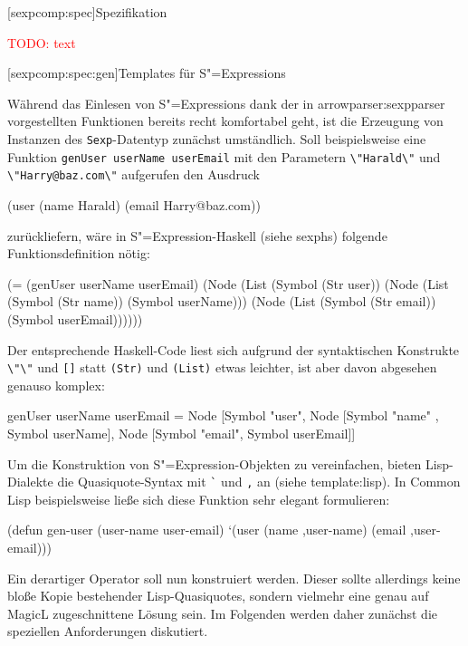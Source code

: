 \documentclass[12pt, a4paper, bibgerm]{scrbook}
\newenvironment{DIFnomarkup}{}{}
\newcommand\icode[1]{\lstinline?#1?}
\newcommand{\todo}[1]{
  \textcolor{red}{TODO: #1}
}
\newcommand\lsection{}
\newcommand\lsubsection{}
\newcommand\cref{}
\newcommand\sref{}
\newcommand{\seec}[1]{(siehe \cref{#1})}
\newcommand{\sees}[1]{(siehe \sref{#1})}
\newcommand{\sexp}{S"=Expression}
\newcommand{\sexps}{S"=Expressions}
\begin{document}
\lsection[sexpcomp:spec]{Spezifikation}

\todo{text}

\lsubsection[sexpcomp:spec:gen]{Templates für \sexps}

Während das Einlesen von \sexps{} dank der in
\sref{arrowparser:sexpparser} vorgestellten Funktionen bereits recht
komfortabel geht, ist die Erzeugung von Instanzen des
\icode{Sexp}-Datentyp zunächst umständlich. Soll beispielsweise eine
Funktion \icode{genUser userName userEmail} mit den Parametern
\icode{\"Harald\"} und \icode{\"Harry@baz.com\"} aufgerufen den Ausdruck
\begin{DIFnomarkup}\begin{code}
(user (name Harald) (email Harry@baz.com))
\end{code}\end{DIFnomarkup}
zurückliefern, wäre
in \sexp{}-Haskell \seec{sexphs} folgende Funktionsdefinition
nötig:
\begin{DIFnomarkup}\begin{code}
(= (genUser userName userEmail)
   (Node (List (Symbol (Str user))
               (Node (List (Symbol (Str  name)) (Symbol userName)))
               (Node (List (Symbol (Str email)) (Symbol userEmail))))))
\end{code}\end{DIFnomarkup}
Der entsprechende Haskell-Code liest sich aufgrund der syntaktischen
Konstrukte \icode{\"\"} und \icode{[]} statt \icode{(Str)} und
\icode{(List)} etwas leichter, ist aber davon abgesehen genauso komplex:
\begin{DIFnomarkup}\begin{code}
genUser userName userEmail =
   Node [Symbol "user",
         Node [Symbol "name" , Symbol userName],
         Node [Symbol "email", Symbol userEmail]]
\end{code}\end{DIFnomarkup}
Um die Konstruktion von \sexp{}-Objekten zu vereinfachen, bieten
Lisp-Dialekte die Quasiquote-Syntax mit \icode{`} und \icode{,} an
\sees{template:lisp}. In Common Lisp beispielsweise ließe sich diese
Funktion sehr elegant formulieren:
\begin{DIFnomarkup}\begin{code}
(defun gen-user (user-name user-email)
  `(user (name ,user-name) (email ,user-email)))
\end{code}\end{DIFnomarkup}
Ein derartiger Operator soll nun konstruiert werden. Dieser sollte
allerdings keine bloße Kopie bestehender Lisp-Quasiquotes, sondern
vielmehr eine genau auf MagicL zugeschnittene Lösung sein. Im Folgenden
werden daher zunächst die speziellen Anforderungen diskutiert.
\end{document}
